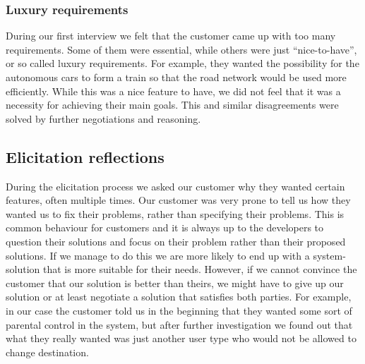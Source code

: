 \documentclass[10pt]{article}
\begin{document}
\subsubsection{Luxury requirements}
During our first interview we felt that the customer came up with too many requirements. Some of them were essential, while others were just “nice-to-have”, or so called luxury requirements. For example, they wanted the possibility for the autonomous cars to form a train so that the road network would be used more efficiently. While this was a nice feature to have, we did not feel that it was a necessity for achieving their main goals. This and similar disagreements were solved by further negotiations and reasoning. 

\subsection{Elicitation reflections}
During the elicitation process we asked our customer why they wanted certain features, often multiple times. Our customer was very prone to tell us how they wanted us to fix their problems, rather than specifying their problems. This is common behaviour for customers and it is always up to the developers to question their solutions and focus on their problem rather than their proposed solutions. If we manage to do this we are more likely to end up with a system-solution that is more suitable for their needs. However, if we cannot convince the customer that our solution is better than theirs, we might have to give up our solution or at least negotiate a solution that satisfies both parties.
For example, in our case the customer told us in the beginning that they wanted some sort of parental control in the system, but after further investigation we found out that what they really wanted was just another user type who would not be allowed to change destination.
\newline
\end{document}
